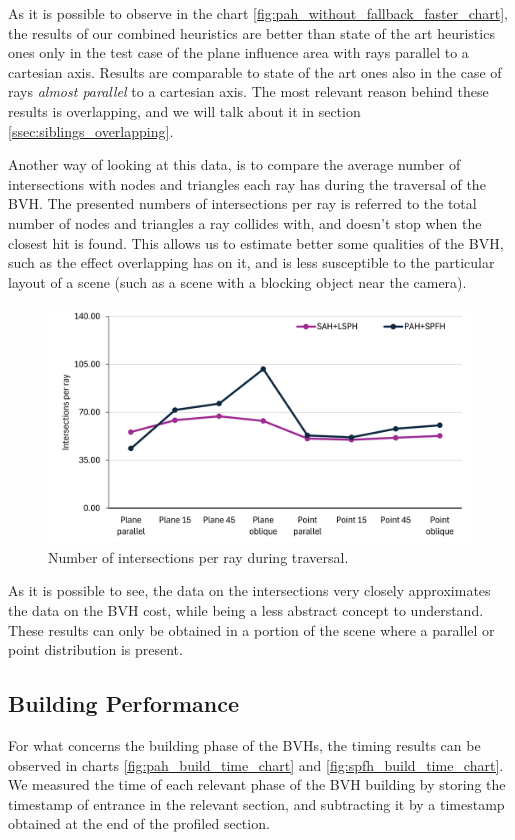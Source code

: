 \documentclass{PoliMi_MasterThesis}
\begin{document}
As it is possible to observe in the chart \ref{fig:pah_without_fallback_faster_chart}, the results of our combined heuristics are better than state of the art heuristics ones only in the test case of the plane influence area with rays parallel to a cartesian axis. Results are comparable to state of the art ones also in the case of rays \textit{almost parallel} to a cartesian axis. The most relevant reason behind these results is overlapping, and we will talk about it in section \ref{ssec:siblings_overlapping}.

Another way of looking at this data, is to compare the average number of intersections with nodes and triangles each ray has during the traversal of the BVH. The presented numbers of intersections per ray is referred to the total number of nodes and triangles a ray collides with, and doesn't stop when the closest hit is found. This allows us to estimate better some qualities of the BVH, such as the effect overlapping has on it, and is less susceptible to the particular layout of a scene (such as a scene with a blocking object near the camera).

\begin{figure}[H] 
	\centering
	\includegraphics[width=\textwidth]{Images/pah_without_fallback_faster_intersections_chart.png}
	\caption{Number of intersections per ray during traversal.}
	\label{fig:pah_without_fallback_faster_intersections_chart}
\end{figure}

As it is possible to see, the data on the intersections very closely approximates the data on the BVH cost, while being a less abstract concept to understand. These results can only be obtained in a portion of the scene where a parallel or point distribution is present.

\subsection{Building Performance} \label{ssec:building_performance}
For what concerns the building phase of the BVHs, the timing results can be observed in charts \ref{fig:pah_build_time_chart} and \ref{fig:spfh_build_time_chart}. We measured the time of each relevant phase of the BVH building by storing the timestamp of entrance in the relevant section, and subtracting it by a timestamp obtained at the end of the profiled section.
\end{document}
